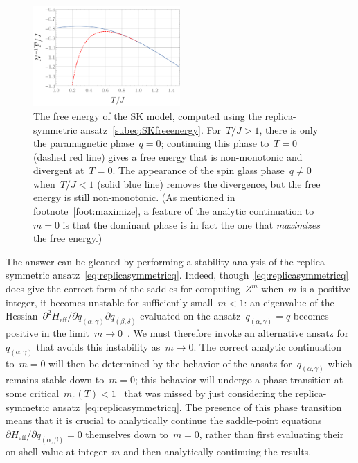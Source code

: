 \documentclass[12pt]{article}
\begin{document}
\begin{figure}[t]
\centering
\includegraphics[width=0.5\textwidth]{SK_Free_Energy_replica_symmetric}
\caption{The free energy of the SK model, computed using the replica-symmetric ansatz~\eqref{subeq:SKfreeenergy}.  For~$T/J > 1$, there is only the paramagnetic phase~$q = 0$; continuing this phase to~$T = 0$ (dashed red line) gives a free energy that is non-monotonic and divergent at~$T = 0$.  The appearance of the spin glass phase~$q \neq 0$ when~$T/J < 1$ (solid blue line) removes the divergence, but the free energy is still non-monotonic.  (As mentioned in footnote~\ref{foot:maximize}, a feature of the analytic continuation to~$m = 0$ is that the dominant phase is in fact the one that \textit{maximizes} the free energy.)}
\label{fig:SKfreeenergy}
\end{figure}

The answer can be gleaned by performing a stability analysis of the replica-symmetric ansatz~\eqref{eq:replicasymmetricq}.  Indeed, though~\eqref{eq:replicasymmetricq} does give the correct form of the saddles for computing~$\overline{Z^m}$ when~$m$ is a positive integer, it becomes unstable for sufficiently small~$m < 1$: an eigenvalue of the Hessian~$\partial^2 H_\mathrm{eff}/\partial q_{(\alpha,\gamma)} \partial q_{(\beta,\delta)}$ evaluated on the ansatz~$q_{(\alpha,\gamma)} = q$ becomes positive in the limit~$m \to 0$~\cite{AlmTho78}.  We must therefore invoke an alternative ansatz for~$q_{(\alpha,\gamma)}$ that avoids this instability as~$m \to 0$.  The correct analytic continuation to~$m = 0$ will then be determined by the behavior of the ansatz for~$q_{(\alpha,\gamma)}$ which remains stable down to~$m = 0$; this behavior will undergo a phase transition at some critical~$m_c(T) < 1$~\cite{Kon83} that was missed by just considering the replica-symmetric ansatz~\eqref{eq:replicasymmetricq}.  The presence of this phase transition means that it is crucial to analytically continue the saddle-point equations~$\partial H_\mathrm{eff}/\partial q_{(\alpha,\beta)} = 0$ themselves down to~$m = 0$, rather than first evaluating their on-shell value at integer~$m$ and then analytically continuing the results.
\end{document}
